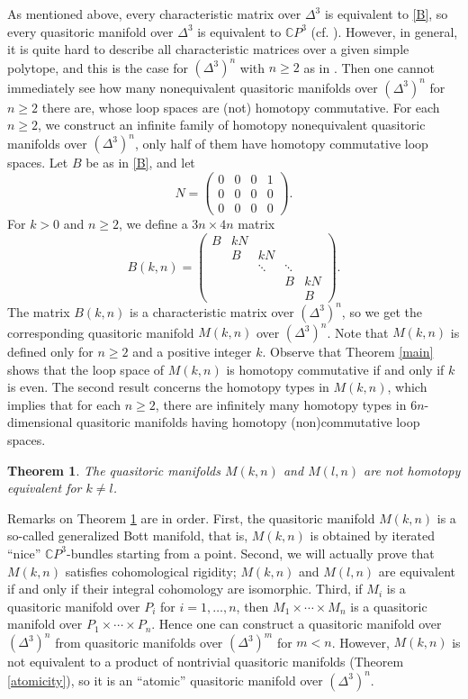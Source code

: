 \documentclass[a4paper]{amsart}
\numberwithin{equation}{section}
\newtheorem{theorem}{Theorem}[section]
\theoremstyle{definition}
\theoremstyle{remark}
\numberwithin{equation}{section}
\newcommand{\C}{\mathbb{C}}
\begin{document}
As mentioned above, every characteristic matrix over $\Delta^3$ is equivalent to \eqref{B}, so every quasitoric manifold over $\Delta^3$ is equivalent to $\C P^3$ (cf. \cite[Example 1.18]{DJ}). However, in general, it is quite hard to describe all characteristic matrices over a given simple polytope, and this is the case for $(\Delta^3)^n$ with $n\ge 2$ as in \cite{CMS}. Then one cannot immediately see how many nonequivalent quasitoric manifolds over $(\Delta^3)^n$ for $n\ge 2$ there are, whose loop spaces are (not) homotopy commutative. For each $n\ge 2$, we construct an infinite family of homotopy nonequivalent quasitoric manifolds over $(\Delta^3)^n$, only half of them have homotopy commutative loop spaces. Let $B$ be as in \eqref{B}, and let
\[
  N=\begin{pmatrix}0&0&0&1\\0&0&0&0\\0&0&0&0\end{pmatrix}.
\]
For $k>0$ and $n\ge 2$, we define a $3n\times 4n$ matrix
\[
  B(k,n)=
  \begin{pmatrix}
    B&kN\\
    &B&kN\\
    &&\ddots&\ddots\\
    &&&B&kN\\
    &&&&B
  \end{pmatrix}.
\]
The matrix $B(k,n)$ is a characteristic matrix over $(\Delta^3)^n$, so we get the corresponding quasitoric manifold $M(k,n)$ over $(\Delta^3)^n$. Note that $M(k,n)$ is defined only for $n\ge 2$ and a positive integer $k$. Observe that Theorem \ref{main} shows that the loop space of $M(k,n)$ is homotopy commutative if and only if $k$ is even. The second result concerns the homotopy types in $M(k,n)$, which implies that for each $n\ge 2$, there are infinitely many homotopy types in $6n$-dimensional quasitoric manifolds having homotopy (non)commutative loop spaces.



\begin{theorem}
  \label{family}
  The quasitoric manifolds $M(k,n)$ and $M(l,n)$ are not homotopy equivalent for $k\ne l$.
\end{theorem}



Remarks on Theorem \ref{family} are in order. First, the quasitoric manifold $M(k,n)$ is a so-called generalized Bott manifold, that is, $M(k,n)$ is obtained by iterated ``nice'' $\C P^3$-bundles starting from a point. Second, we will actually prove that $M(k,n)$ satisfies cohomological rigidity; $M(k,n)$ and $M(l,n)$ are equivalent if and only if their integral cohomology are isomorphic. Third, if $M_i$ is a quasitoric manifold over $P_i$ for $i=1,\ldots,n$, then $M_1\times\cdots\times M_n$ is a quasitoric manifold over $P_1\times\cdots\times P_n$. Hence one can construct a quasitoric manifold over $(\Delta^3)^n$ from quasitoric manifolds over $(\Delta^3)^m$ for $m<n$. However, $M(k,n)$ is not equivalent to a product of nontrivial quasitoric manifolds (Theorem \ref{atomicity}), so it is an ``atomic'' quasitoric manifold over $(\Delta^3)^n$.
\end{document}
